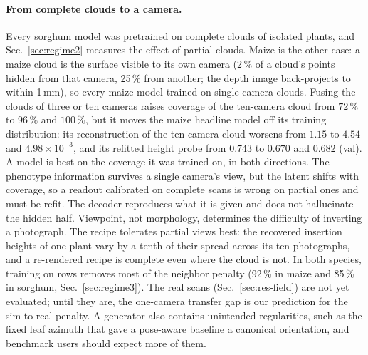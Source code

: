 \paragraph{From complete clouds to a camera.}
Every sorghum model was pretrained on complete clouds of isolated plants, and
Sec.~\ref{sec:regime2} measures the effect of partial clouds. Maize is the other
case: a maize cloud is the surface visible to its own camera (2\,\% of a
cloud's points hidden from that camera, 25\,\% from another; the depth image
back-projects to within 1\,mm), so every maize model trained on single-camera
clouds. Fusing the clouds of three or ten cameras raises coverage of the
ten-camera cloud from $72\,\%$ to $96\,\%$ and $100\,\%$, but it moves the
maize headline model off its training distribution: its reconstruction of the
ten-camera cloud worsens from $1.15$ to $4.54$ and $4.98\times10^{-3}$, and its
refitted height probe from $0.743$ to $0.670$ and $0.682$ (val). A model is best
on the coverage it was trained on, in both directions. The phenotype information survives a
single camera's view, but the latent shifts with coverage, so a readout
calibrated on complete scans is wrong on partial ones and must be refit. The
decoder reproduces what it is given and does not hallucinate the hidden half.
Viewpoint, not morphology, determines the difficulty of inverting a photograph.
The recipe tolerates partial views best: the recovered insertion heights of one
plant vary by a tenth of their spread across its ten photographs, and a
re-rendered recipe is complete even where the cloud is not. In both species,
training on rows removes most of the neighbor penalty (92\,\% in maize and
85\,\% in sorghum, Sec.~\ref{sec:regime3}). The real scans
(Sec.~\ref{sec:res-field}) are not yet evaluated; until they are, the
one-camera transfer gap is our prediction for the sim-to-real penalty. A generator also contains unintended
regularities, such as the fixed leaf azimuth that gave a pose-aware baseline a
canonical orientation, and benchmark users should expect more of them.

